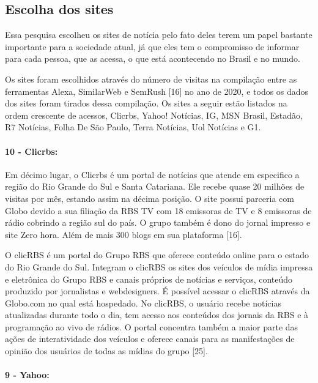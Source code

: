 \documentclass[a4paper]{article}
\begin{document}
\begin{titlepage}
\subsection{Escolha dos sites}

Essa pesquisa escolheu os sites de notícia pelo fato deles terem um papel bastante importante para a sociedade atual, já que eles tem o compromisso de informar para cada pessoa, que as acessa, o que está acontecendo no Brasil e no mundo.

Os sites foram escolhidos através do número de visitas na compilação entre as ferramentas Alexa, SimilarWeb e SemRush [16] no ano de 2020, e todos os dados dos sites foram tirados dessa compilação. Os sites a seguir estão listados na ordem crescente de acessos, Clicrbs, Yahoo! Notícias, IG, MSN Brasil, Estadão, R7 Notícias, Folha De São Paulo, Terra Notícias, Uol Notícias e G1.

\paragraph{10 - Clicrbs: }

Em décimo lugar, o Clicrbs é um portal de notícias que atende em especifico a região do Rio Grande do Sul e Santa Catariana. Ele recebe quase 20 milhões de visitas por mês, estando assim na décima posição. O site possui parceria com Globo devido a sua filiação da RBS TV com 18 emissoras de TV e 8 emissoras de rádio cobrindo a região sul do país. O grupo também é dono do jornal impresso e site Zero hora. Além de mais 300 blogs em sua plataforma [16].

O clicRBS é um portal do Grupo RBS que oferece conteúdo online para o estado do Rio Grande do Sul. Integram o clicRBS os sites dos veículos de mídia impressa e eletrônica do Grupo RBS e canais próprios de notícias e serviços, conteúdo produzido por jornalistas e webdesigners. É possível acessar o clicRBS através da Globo.com no qual está hospedado. No clicRBS, o usuário recebe notícias atualizadas durante todo o dia, tem acesso aos conteúdos dos jornais da RBS e à programação ao vivo de rádios. O portal concentra também a maior parte das ações de interatividade dos veículos e oferece canais para as manifestações de opinião dos usuários de todas as mídias do grupo [25].

\paragraph{9 - Yahoo: }


\end{titlepage}
\end{document}
